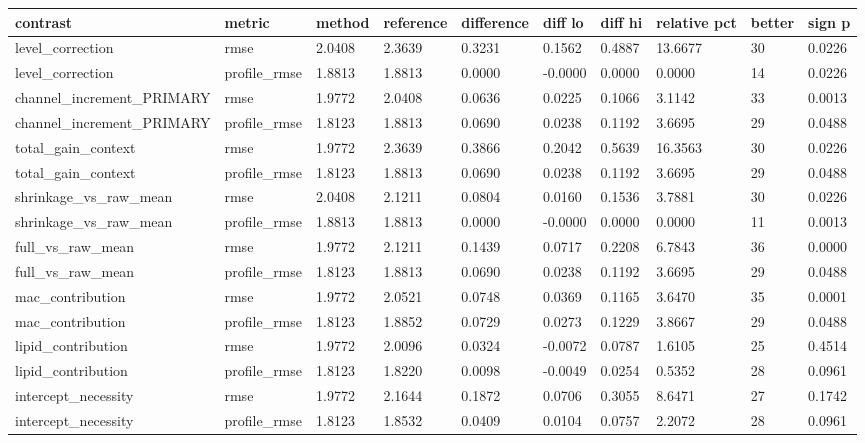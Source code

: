 {\footnotesize\setlength{\tabcolsep}{3pt}
\begin{longtable}{llllllllll}
\toprule
\textbf{contrast} & \textbf{metric} & \textbf{method} & \textbf{reference} & \textbf{difference} & \textbf{diff lo} & \textbf{diff hi} & \textbf{relative pct} & \textbf{better} & \textbf{sign p} \\
\midrule
\endhead
level\_correction & rmse & 2.0408 & 2.3639 & 0.3231 & 0.1562 & 0.4887 & 13.6677 & 30 & 0.0226 \\
level\_correction & profile\_rmse & 1.8813 & 1.8813 & 0.0000 & -0.0000 & 0.0000 & 0.0000 & 14 & 0.0226 \\
channel\_increment\_PRIMARY & rmse & 1.9772 & 2.0408 & 0.0636 & 0.0225 & 0.1066 & 3.1142 & 33 & 0.0013 \\
channel\_increment\_PRIMARY & profile\_rmse & 1.8123 & 1.8813 & 0.0690 & 0.0238 & 0.1192 & 3.6695 & 29 & 0.0488 \\
total\_gain\_context & rmse & 1.9772 & 2.3639 & 0.3866 & 0.2042 & 0.5639 & 16.3563 & 30 & 0.0226 \\
total\_gain\_context & profile\_rmse & 1.8123 & 1.8813 & 0.0690 & 0.0238 & 0.1192 & 3.6695 & 29 & 0.0488 \\
shrinkage\_vs\_raw\_mean & rmse & 2.0408 & 2.1211 & 0.0804 & 0.0160 & 0.1536 & 3.7881 & 30 & 0.0226 \\
shrinkage\_vs\_raw\_mean & profile\_rmse & 1.8813 & 1.8813 & 0.0000 & -0.0000 & 0.0000 & 0.0000 & 11 & 0.0013 \\
full\_vs\_raw\_mean & rmse & 1.9772 & 2.1211 & 0.1439 & 0.0717 & 0.2208 & 6.7843 & 36 & 0.0000 \\
full\_vs\_raw\_mean & profile\_rmse & 1.8123 & 1.8813 & 0.0690 & 0.0238 & 0.1192 & 3.6695 & 29 & 0.0488 \\
mac\_contribution & rmse & 1.9772 & 2.0521 & 0.0748 & 0.0369 & 0.1165 & 3.6470 & 35 & 0.0001 \\
mac\_contribution & profile\_rmse & 1.8123 & 1.8852 & 0.0729 & 0.0273 & 0.1229 & 3.8667 & 29 & 0.0488 \\
lipid\_contribution & rmse & 1.9772 & 2.0096 & 0.0324 & -0.0072 & 0.0787 & 1.6105 & 25 & 0.4514 \\
lipid\_contribution & profile\_rmse & 1.8123 & 1.8220 & 0.0098 & -0.0049 & 0.0254 & 0.5352 & 28 & 0.0961 \\
intercept\_necessity & rmse & 1.9772 & 2.1644 & 0.1872 & 0.0706 & 0.3055 & 8.6471 & 27 & 0.1742 \\
intercept\_necessity & profile\_rmse & 1.8123 & 1.8532 & 0.0409 & 0.0104 & 0.0757 & 2.2072 & 28 & 0.0961 \\
\bottomrule
\end{longtable}}
